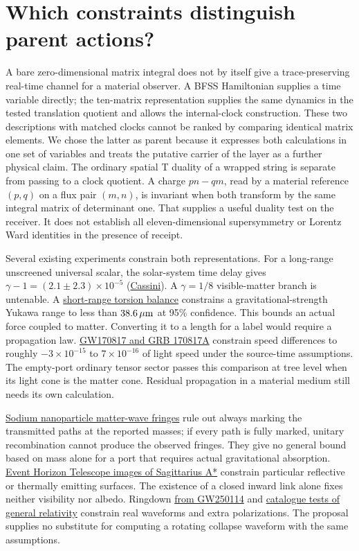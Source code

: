 \section{Which constraints distinguish parent actions?}
A bare zero-dimensional matrix integral does not by itself give a trace-preserving real-time channel for a material observer. A BFSS Hamiltonian supplies a time variable directly; the ten-matrix representation supplies the same dynamics in the tested translation quotient and allows the internal-clock construction. These two descriptions with matched clocks cannot be ranked by comparing identical matrix elements. We chose the latter as parent because it expresses both calculations in one set of variables and treats the putative carrier of the layer as a further physical claim. The ordinary spatial T duality of a wrapped string is separate from passing to a clock quotient. A charge \(pn-qm\), read by a material reference \((p,q)\) on a flux pair \((m,n)\), is invariant when both transform by the same integral matrix of determinant one. That supplies a useful duality test on the receiver. It does not establish all eleven-dimensional supersymmetry or Lorentz Ward identities in the presence of receipt.

Several existing experiments constrain both representations. For a long-range unscreened universal scalar, the solar-system time delay gives \(\gamma-1=(2.1\pm2.3)\times10^{-5}\) (\href{https://doi.org/10.1038/nature01997}{Cassini}). A \(\gamma=1/8\) visible-matter branch is untenable. A \href{https://arxiv.org/abs/2002.11761}{short-range torsion balance} constrains a gravitational-strength Yukawa range to less than \(38.6\,\mu{\rm m}\) at 95\% confidence. This bounds an actual force coupled to matter. Converting it to a length for a label would require a propagation law. \href{https://arxiv.org/abs/1710.05834}{GW170817 and GRB 170817A} constrain speed differences to roughly \(-3\times10^{-15}\) to \(7\times10^{-16}\) of light speed under the source-time assumptions. The empty-port ordinary tensor sector passes this comparison at tree level when its light cone is the matter cone. Residual propagation in a material medium still needs its own calculation.

\href{https://arxiv.org/abs/2507.21211}{Sodium nanoparticle matter-wave fringes} rule out always marking the transmitted paths at the reported masses; if every path is fully marked, unitary recombination cannot produce the observed fringes. They give no general bound based on mass alone for a port that requires actual gravitational absorption. \href{https://arxiv.org/abs/2311.09484}{Event Horizon Telescope images of Sagittarius A*} constrain particular reflective or thermally emitting surfaces. The existence of a closed inward link alone fixes neither visibility nor albedo. Ringdown \href{https://arxiv.org/abs/2509.08099}{from GW250114} and \href{https://arxiv.org/abs/2607.19293}{catalogue tests of general relativity} constrain real waveforms and extra polarizations. The proposal supplies no substitute for computing a rotating collapse waveform with the same assumptions.

